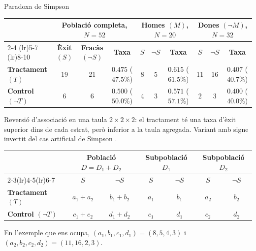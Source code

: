 \documentclass{bestbeamer}
\begin{document}
\begin{frame}{Paradoxa de Simpson}
\footnotesize
\begin{table}[H]
\centering
\setlength{\tabcolsep}{3pt}
\begin{tabular}{@{}l*{9}{c}@{}}
\toprule
 & \multicolumn{3}{c}{\textbf{Població completa}, $N=52$}
 & \multicolumn{3}{c}{\textbf{Homes} $(M)$, $N=20$}
 & \multicolumn{3}{c}{\textbf{Dones} $(\neg M)$, $N=32$} \\
\cmidrule{2-4} \cmidrule(lr){5-7} \cmidrule(lr){8-10}
 &
\textbf{Èxit $(S)$} & \textbf{Fracàs $(\neg S)$} & \textbf{Taxa} &
\textbf{$S$} & \textbf{$\neg S$} & \textbf{Taxa} &
\textbf{$S$} & \textbf{$\neg S$} & \textbf{Taxa} \\

\textbf{Tractament $(T)$}    & 19 & 21 & $0.475$ ($47.5\%$) & 8 & 5 & $0.615$ ($61.5\%$) & 11 & 16 & $0.407$ ($40.7\%$) \\
\textbf{Control $(\neg T)$}  & 6  & 6  & $0.500$ ($50.0\%$) & 4 & 3 & $0.571$ ($57.1\%$) & 2  & 3  & $0.400$ ($40.0\%$) \\

\bottomrule
\end{tabular}
\end{table}
{ Reversió d'associació en una taula $2\times2\times2$: el tractament té una taxa d'èxit superior dins de cada estrat, però inferior a la taula agregada. Variant amb signe invertit del cas artificial de Simpson \cite[pp.~240--241]{simpson1951}.}
\begin{table}[H]
  \centering
  \setlength{\tabcolsep}{6pt}
  \begin{tabular}{lcccccc}
    \toprule
    & \multicolumn{2}{c}{\textbf{Població $D = D_1 + D_2$}}
    & \multicolumn{2}{c}{\textbf{Subpoblació $D_1$}}
    & \multicolumn{2}{c}{\textbf{Subpoblació $D_2$}}\\
    \cmidrule(lr){2-3}\cmidrule(lr){4-5}\cmidrule(lr){6-7}
    & \textbf{$S$} & \textbf{$\neg S$}
    & \textbf{$S$} & \textbf{$\neg S$}
    & \textbf{$S$} & \textbf{$\neg S$}\\
    \midrule
    \textbf{Tractament $(T)$}    & $a_1+a_2$ & $b_1+b_2$ & $a_1$ & $b_1$ & $a_2$ & $b_2$\\
    \textbf{Control $(\neg T)$}  & $c_1+c_2$ & $d_1+d_2$ & $c_1$ & $d_1$ & $c_2$ & $d_2$\\
    \bottomrule
  \end{tabular}
\end{table}
En l'exemple que ens ocupa, $(a_1,b_1,c_1,d_1)=(8,5,4,3)$ i $(a_2,b_2,c_2,d_2)=(11,16,2,3)$.
\end{frame}
\end{document}
